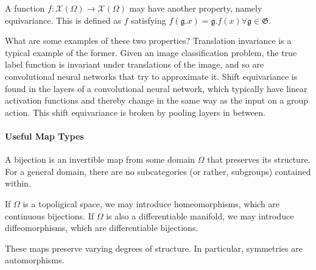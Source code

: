 A function $f: \mathcal{X}(\Omega)\to\mathcal{X}(\Omega)$ may have another property, namely equivariance. This is defined as $f$ satisfying $f(\mathfrak{g}.x) = \mathfrak{g}.f(x)\forall\mathfrak{g}\in\mathfrak{G}$.

What are some examples of these two properties? Translation invariance is a typical example of the former. Given an image classification problem, the true label function is invariant under translations of the image, and so are convolutional neural networks that try to approximate it. Shift equivariance is found in the layers of a convolutional neural network, which typically have linear activation functions and thereby change in the same way as the input on a group action. This shift equivariance is broken by pooling layers in between.

\paragraph{Useful Map Types}
A bijection is an invertible map from some domain $\Omega$ that preserves its structure. For a general domain, there are no subcategories (or rather, subgroups) contained within.

If $\Omega$ is a topoligical space, we may introduce homeomorphisms, which are continuous bijections. If $\Omega$ is also a differentiable manifold, we may introduce diffeomorphisms, which are differentiable bijections.

These maps preserve varying degrees of structure. In particular, symmetries are automorphisms.
